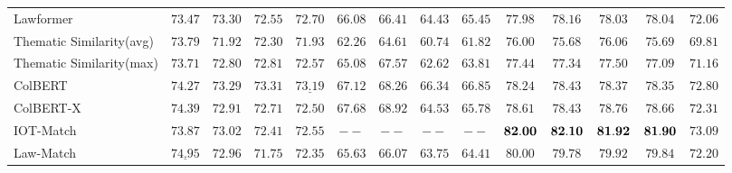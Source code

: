 \begin{table*}[t]
{\begin{tabular}{lccccccccccccc}
 Lawformer                  & $ 73.47 $     & $ 73.30 $     & $ 72.55 $     & $ 72.70 $     
                            & $ 66.08 $     & $ 66.41 $     & $ 64.43 $     & $ 65.45 $     
                            & $ 77.98 $     & $ 78.16 $     & $ 78.03 $     & $ 78.04 $     & $72.06$ \\

 Thematic Similarity(avg)   & $ 73.79 $     & $ 71.92 $     & $ 72.30 $     & $ 71.93 $     
                            & $ 62.26 $     & $ 64.61 $     & $ 60.74 $     & $ 61.82 $        
                            & $ 76.00 $     & $ 75.68 $     & $ 76.06 $     & $ 75.69 $     & $69.81$\\

 Thematic Similarity(max)   & $ 73.71 $     & $ 72.80 $     & $ 72.81 $     & $ 72.57 $     
                            & $ 65.08 $     & $ 67.57 $     & $ 62.62 $     & $ 63.81 $     
                            & $ 77.44 $     & $ 77.34 $     & $ 77.50 $     & $ 77.09 $     & $71.16$\\
 ColBERT   & $ 74.27 $     & $ 73.29 $     & $ 73.31 $     & $ \underline{73.19} $ 
                            & $ 67.12 $     & $ 68.26 $     & $ 66.34 $     & $ 66.85 $  
                            & $ 78.24 $     & $ 78.43 $     & $ 78.37 $     & $ 78.35 $  & $ 72.80 $  \\

 ColBERT-X & $ 74.39 $     & $ 72.91 $     & $ 72.71 $     & $ 72.50 $     
                            & $ 67.68 $     & $ 68.92 $     & $ 64.53 $     & $ 65.78 $    
                            & $ 78.61 $     & $ 78.43 $     & $ 78.76 $     & $ 78.66 $     & $ 72.31 $  \\

 IOT-Match                  & $ 73.87 $     & $ 73.02 $     & $ 72.41 $     & $ 72.55 $     
                            & $ -- $     & $ -- $     & $ -- $     & $ -- $     
                            & $ \bf 82.00 $     & $ \bf 82.10 $     & $ \bf 81.92 $     & $ \bf 81.90 $     & $73.09$\\

 Law-Match                  & $ \underline{74.95} $     & $ 72.96 $     & $ 71.75 $     & $ 72.35 $     
                            & $ 65.63 $     & $ 66.07 $     & $ 63.75 $     & $ 64.41 $     
                            & $ 80.00 $     & $ 79.78 $     & $ 79.92 $     & $ 79.84 $     & $72.20$\\
                            

\end{tabular}}
\end{table*}
